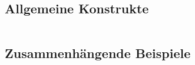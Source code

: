 \subsection{Allgemeine Konstrukte}
\begin{tabular}{|l|l|l|}
	\hline
     
     & 
     
     &
 	      
     \\ \hline
\end{tabular}

\subsection{Zusammenhängende Beispiele}


